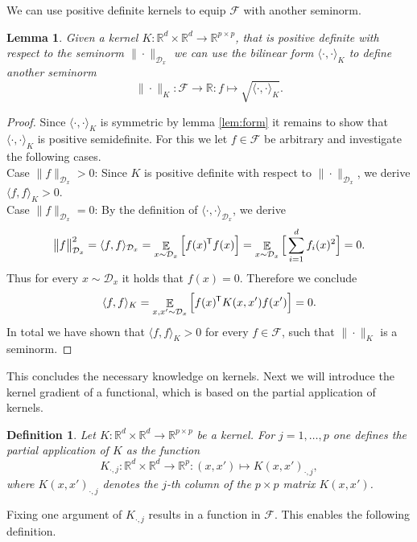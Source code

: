 \documentclass[11pt, a4paper]{article}
\newtheorem{lemma}[theorem]{Lemma}
\newtheorem{definition}[theorem]{Definition}
\newcommand{\R}{\mathbb{R}}
\newcommand{\D}{\mathcal{D}}
\newcommand{\F}{\mathcal{F}}
\newcommand*{\tr}{^{\mkern-1.5mu\mathsf{T}}}
\DeclareMathOperator*{\E}{\mathbb{E}}
\begin{document}
We can use positive definite kernels to equip $\F$ with another seminorm.

\begin{lemma}
Given a kernel $K: \R^d \times \R^d \to \R^{p \times p}$, that is positive definite with respect to the seminorm $\| \cdot \|_{\D_x}$ we can use the bilinear form $\langle \cdot, \cdot \rangle_K$ to define another seminorm
\[ \| \cdot \|_K: \F \to \R : f \mapsto \sqrt{\langle \cdot, \cdot \rangle_K}.  \]
\end{lemma}

\begin{proof}
Since $\langle \cdot, \cdot \rangle_K$ is symmetric by lemma \ref{lem:form} it remains to show that $\langle \cdot, \cdot \rangle_K$ is positive semidefinite. For this we let $f \in \F$ be arbitrary and investigate the following cases. \\

Case $\| f \|_{\D_x} > 0$: Since $K$ is positive definite with respect to $\| \cdot \| _{\D_x}$, we derive $\langle f, f \rangle_K > 0$. \\

Case $\| f \|_{\D_x} = 0$: By the definition of $\langle \cdot , \cdot \rangle_{\D_x}$, we derive
\[ \big \| f \big \|_{\D_x}^2 = \langle f , f \rangle_{\D_x} = \E_{x \sim \D_x} \Big [ f(x)\tr f(x) \Big ] = \E_{x \sim \D_x} \Big [ \sum_{i=1}^{d} f_i(x)^2 \Big ] = 0. \]
Thus for every $x \sim \D_x$ it holds that $f(x) = 0$. Therefore we conclude
\[ \langle f , f \rangle_{K} = \E_{x,x' \sim \D_x} \Big [ f(x)\tr K(x,x')f(x') \Big ] = 0. \]
In total we have shown that $\langle f, f \rangle_K > 0$ for every $f \in \F$, such that $\| \cdot \|_K$ is a seminorm.
\end{proof}

This concludes the necessary knowledge on kernels. Next we will introduce the kernel gradient of a functional, which is based on the partial application of kernels.

\begin{definition}
Let $K: \R^d \times \R^d \to \R^{p \times p}$ be a kernel. For $j=1, \dots, p$ one defines the partial application of $K$ as the function
\[ K_{\cdot,j} : \R^d \times \R^d \to \R^p : (x,x') \mapsto K(x,x')_{\cdot,j}, \]
where $K(x,x')_{\cdot,j}$ denotes the $j$-th column of the $p \times p $ matrix $K(x,x')$.
\end{definition}

Fixing one argument of $K_{\cdot,j}$ results in a function in $\F$. This enables the following definition.
\end{document}
